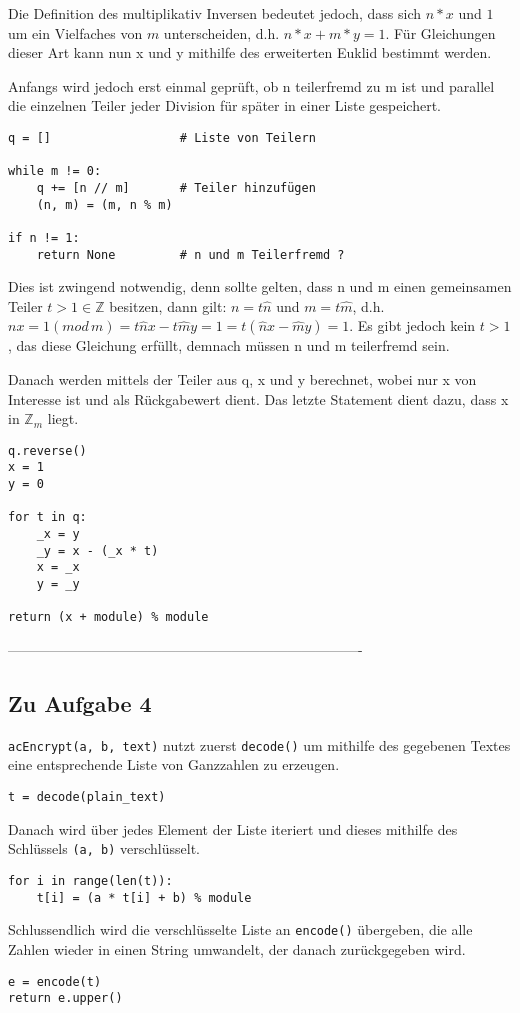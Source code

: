 \documentclass[12pt]{article}
\begin{document}
Die Definition des multiplikativ Inversen bedeutet jedoch, dass sich $n * x$ und $1$ um ein Vielfaches von $m$ unterscheiden, d.h. $n*x + m*y = 1$. Für Gleichungen dieser Art kann nun x und y mithilfe des erweiterten Euklid bestimmt werden.

Anfangs wird jedoch erst einmal geprüft, ob n teilerfremd zu m ist und parallel die einzelnen Teiler jeder Division für später in einer Liste gespeichert.
\begin{lstlisting}
q = []					# Liste von Teilern

while m != 0:
	q += [n // m]		# Teiler hinzufügen
	(n, m) = (m, n % m)
	
if n != 1:
	return None			# n und m Teilerfremd ?
\end{lstlisting}
Dies ist zwingend notwendig, denn sollte gelten, dass n und m einen gemeinsamen Teiler $t > 1 \in \mathbb{Z}$ besitzen, dann gilt: $n = t\hat{n}$ und $m = t\hat{m}$, d.h. $nx = 1 (mod \, m) = t\hat{n}x - t\hat{m}y = 1 = t(\hat{n}x - \hat{m}y) = 1$. Es gibt jedoch kein $t > 1$, das diese Gleichung erfüllt, demnach müssen n und m teilerfremd sein.

Danach werden mittels der Teiler aus q, x und y berechnet, wobei nur x von Interesse ist und als Rückgabewert dient. Das letzte Statement dient dazu, dass x in $\mathbb{Z}_{m}$ liegt.
\begin{lstlisting}
q.reverse()
x = 1
y = 0

for t in q:
	_x = y
	_y = x - (_x * t)
	x = _x
	y = _y
	
return (x + module) % module
\end{lstlisting}

%
 ----------------------------------------------------------------------------
\subsection{Zu Aufgabe 4}
\texttt{acEncrypt(a, b, text)} nutzt zuerst \texttt{decode()} um mithilfe des gegebenen Textes eine entsprechende Liste von Ganzzahlen zu erzeugen. 
\begin{lstlisting}
t = decode(plain_text)
\end{lstlisting}
Danach wird über jedes Element der Liste iteriert und dieses mithilfe des Schlüssels \texttt{(a, b)} verschlüsselt. 
\begin{lstlisting}
for i in range(len(t)):
	t[i] = (a * t[i] + b) % module
\end{lstlisting}
Schlussendlich wird die verschlüsselte Liste an \texttt{encode()} übergeben, die alle Zahlen wieder in einen String umwandelt, der danach zurückgegeben wird.
\begin{lstlisting}
e = encode(t)
return e.upper()
\end{lstlisting}
\end{document}
